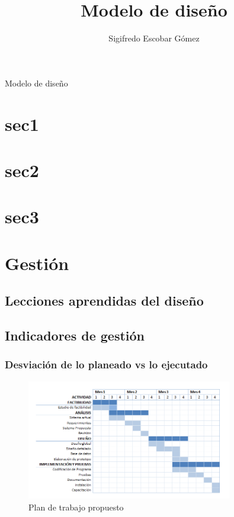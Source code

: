 \documentclass[a4paper,10pt]{article}
\title{Modelo de diseño}
\author{Sigifredo Escobar Gómez}
\date{}
\begin{document}
\maketitle Modelo de diseño

\tableofcontents	%

\newpage

\section{sec1}


\section{sec2}


\section{sec3}

\section{Gestión}
\subsection{Lecciones aprendidas del diseño}
\subsection{Indicadores de gestión}
\subsubsection{Desviación de lo planeado vs lo ejecutado}

\begin{figure}[h!]
  \centering
    \includegraphics[width=0.80\textwidth]{./img/cal1.png}
  \caption{Plan de trabajo propuesto}
\end{figure}
 
\end{document}
